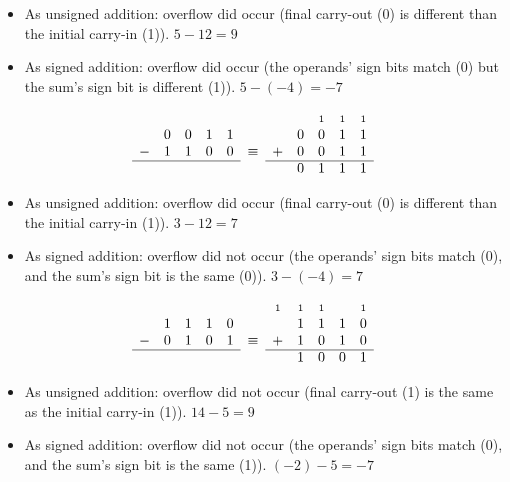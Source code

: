 \documentclass{article}
\newcommand{\carry}{\scriptstyle 1}
\begin{document}
\begin{itemize}
\item As unsigned addition: overflow did occur (final carry-out (0) is
    different than the initial carry-in (1)). $5-12=9$
\item As signed addition: overflow did occur (the operands' sign bits match (0)
    but the sum's sign bit is different (1)). $5-(-4)=-7$
\end{itemize}

\begin{equation*}\begin{array}{ccccccccccc}
  &   &   &   &   &        &   &   & \carry & \carry & \carry \\
  & 0 & 0 & 1 & 1 &        &   & 0 & 0 & 1 & 1 \\
- & 1 & 1 & 0 & 0 & \equiv & + & 0 & 0 & 1 & 1 \\ \cline{1-5}\cline{7-11}
  &   &   &   &   &        &   & 0 & 1 & 1 & 1
\end{array}\end{equation*}

\begin{itemize}
\item As unsigned addition: overflow did occur (final carry-out (0) is
    different than the initial carry-in (1)). $3-12=7$
\item As signed addition: overflow did not occur (the operands' sign bits
    match (0), and the sum's sign bit is the same (0)). $3-(-4)=7$
\end{itemize}

\begin{equation*}\begin{array}{ccccccccccc}
  &   &   &   &   &        & \carry & \carry & \carry &   & \carry \\
  & 1 & 1 & 1 & 0 &        &   & 1 & 1 & 1 & 0 \\
- & 0 & 1 & 0 & 1 & \equiv & + & 1 & 0 & 1 & 0 \\ \cline{1-5}\cline{7-11}
  &   &   &   &   &        &   & 1 & 0 & 0 & 1
\end{array}\end{equation*}

\begin{itemize}
\item As unsigned addition: overflow did not occur (final carry-out (1) is the
    same as the initial carry-in (1)). $14-5=9$
\item As signed addition: overflow did not occur (the operands' sign bits
    match (0), and the sum's sign bit is the same (1)). $(-2)-5=-7$
\end{itemize}
\end{document}
